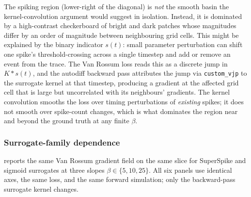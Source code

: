 The spiking region (lower-right of the diagonal) is \emph{not} the smooth basin the kernel-convolution argument would suggest in isolation.
Instead, it is dominated by a high-contrast checkerboard of bright and dark patches whose magnitudes differ by an order of magnitude between neighbouring grid cells.
This might be explained by the binary indicator $s(t)$: small parameter perturbation can shift one spike's threshold-crossing across a single timestep and add or remove an event from the trace.
The Van Rossum loss reads this as a discrete jump in $K \ast s(t)$, and the autodiff backward pass attributes the jump via \texttt{custom\_vjp} to the surrogate kernel at that timestep, producing a gradient at the affected grid cell that is large but uncorrelated with its neighbours' gradients.
The kernel convolution smooths the loss over timing perturbations of \emph{existing} spikes;
it does not smooth over spike-count changes, which is what dominates the region near and beyond the ground truth at any finite $\beta$.

\subsubsection*{Surrogate-family dependence}

 reports the same Van Rossum gradient field on the same slice for SuperSpike and sigmoid surrogates at three slopes $\beta\in\{5,10,25\}$.
All six panels use identical axes, the same loss, and the same forward simulation; only the backward-pass surrogate kernel changes.

